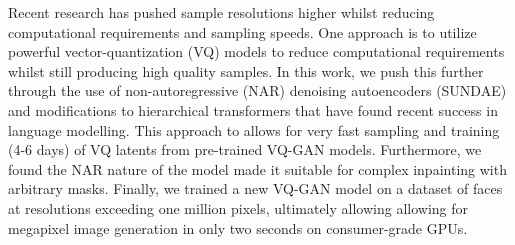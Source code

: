 

Recent research has pushed sample resolutions higher whilst reducing
computational requirements and sampling speeds. One approach is to utilize
powerful vector-quantization (VQ) models to reduce computational requirements
whilst still producing high quality samples. In this work, we push this further
through the use of non-autoregressive (NAR) denoising autoencoders (SUNDAE) and
modifications to hierarchical transformers that have found recent success in
language modelling. This approach to allows for very fast sampling and training
(4-6 days) of VQ latents from pre-trained VQ-GAN models. Furthermore, we found
the NAR nature of the model made it suitable for complex
inpainting with arbitrary masks. Finally, we trained a new VQ-GAN model on a
dataset of faces at resolutions exceeding one million pixels, ultimately
allowing allowing for megapixel image generation in only two seconds on
consumer-grade GPUs.



